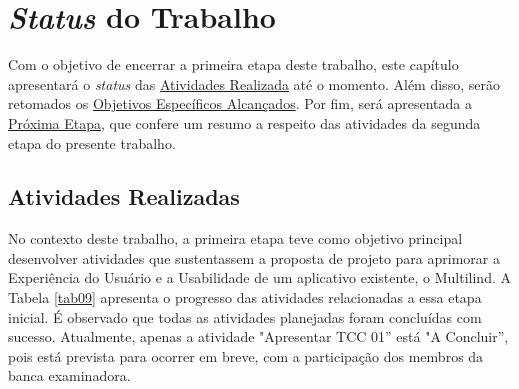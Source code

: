 \chapter[Status do Trabalho]{\textit{Status} do Trabalho}
\label{chap:Status}
Com o objetivo de encerrar a primeira etapa deste trabalho, este capítulo apresentará o \textit{status} das \hyperref[sec:Atividades Realizadas]{Atividades
Realizada} até o momento. Além disso, serão retomados os \hyperref[sec:Objetivos Especificos Alcancados]{Objetivos Específicos Alcançados}. 
Por fim, será apresentada a \hyperref[sec:Proxima Etapa]{Próxima Etapa}, que confere um resumo a respeito das atividades da segunda etapa do presente trabalho.

\section{Atividades Realizadas}
\label{sec:Atividades Realizadas}
No contexto deste trabalho, a primeira etapa teve como objetivo principal desenvolver atividades que sustentassem a proposta 
de projeto para aprimorar a Experiência do Usuário e a Usabilidade de um aplicativo existente, o Multilind. A Tabela \ref{tab09} apresenta 
o progresso das atividades relacionadas a essa etapa inicial. É observado que todas as atividades planejadas foram concluídas com sucesso. 
Atualmente, apenas a atividade "Apresentar TCC 01'' está "A Concluir'', pois está prevista para ocorrer em breve, com a participação dos membros da banca 
examinadora.

